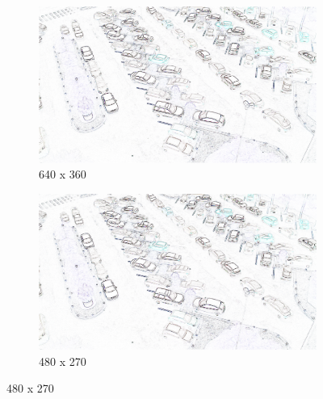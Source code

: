 \begin{figure}[H]
    \bigskip
    \begin{subfigure}{.5\textwidth}
        \centering
        \includegraphics[width=.85\linewidth]{img/conception/image_process/edge-downsample/3.png}
        \caption{640 x 360}
    \end{subfigure}%
    \begin{subfigure}{.5\textwidth}
        \centering
        \includegraphics[width=.85\linewidth]{img/conception/image_process/edge-downsample/2.png}
        \caption{480 x 270}
    \end{subfigure}%
    

\end{figure}
